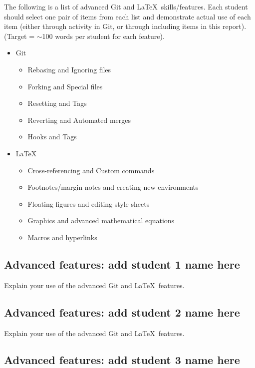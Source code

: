 \documentclass[a4paper, 11pt]{report}
\begin{document}
The following is a list of advanced Git and \LaTeX\ skills/features. Each student should select one pair of items from each list and demonstrate actual use of each item (either through activity in Git, or through including items in this report). (Target = $\sim$100 words per student for each feature).
\begin{itemize}
    \item Git
    \begin{itemize}
        \item Rebasing and Ignoring files
        \item Forking and Special files
        \item Resetting and Tags
        \item Reverting and Automated merges
        \item Hooks and Tags
    \end{itemize}
    \item \LaTeX\ 
    \begin{itemize}
        \item Cross-referencing and Custom commands
        \item Footnotes/margin notes and creating new environments
        \item Floating figures and editing style sheets
        \item Graphics and advanced mathematical equations
        \item Macros and hyperlinks
    \end{itemize}
\end{itemize}

\subsection{Advanced features: add student 1 name here}

Explain your use of the advanced Git and \LaTeX\ features. 

\subsection{Advanced features: add student 2 name here}

Explain your use of the advanced Git and \LaTeX\ features. 

\subsection{Advanced features: add student 3 name here}
\end{document}
